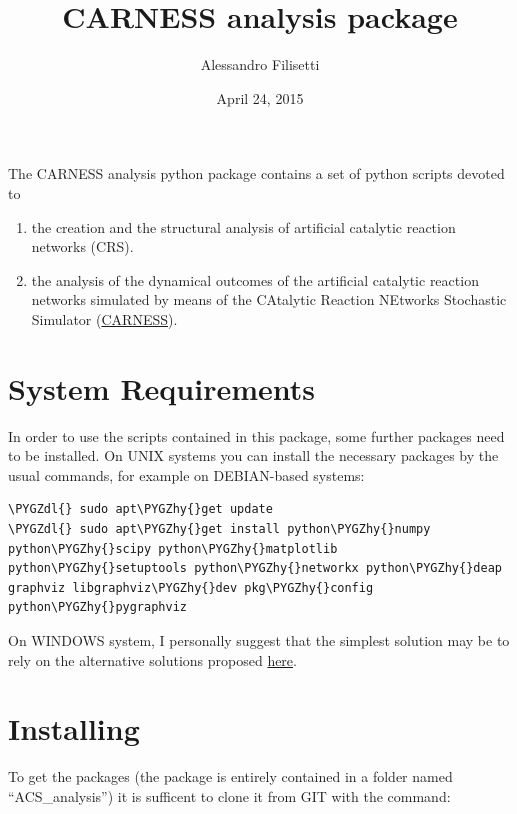\documentclass[letterpaper,10pt,english]{sphinxmanual}
\title{CARNESS analysis package}
\date{April 24, 2015}
\author{Alessandro Filisetti}
\def\PYGZdl{\char`\$}
\def\PYGZhy{\char`\-}
\begin{document}
\maketitle
\tableofcontents
{}\label{index::doc}


The CARNESS analysis python package contains a set of python scripts devoted to
\begin{enumerate}
\item {} 
the creation and the structural analysis of artificial catalytic reaction networks (CRS).

\item {} 
the analysis of the dynamical outcomes of the artificial catalytic reaction networks simulated by means of the CAtalytic Reaction NEtworks Stochastic Simulator (\href{https://github.com/paxelito/carness}{CARNESS}).

\end{enumerate}


\chapter{System Requirements}
\label{index:carness-analysis-python-package-documentation}\label{index:system-requirements}
In order to use the scripts contained in this package, some further packages need to be installed.
On UNIX systems you can install the necessary packages by the usual commands, for example on DEBIAN-based systems:

\begin{Verbatim}[commandchars=\\\{\}]
\PYGZdl{} sudo apt\PYGZhy{}get update
\PYGZdl{} sudo apt\PYGZhy{}get install python\PYGZhy{}numpy python\PYGZhy{}scipy python\PYGZhy{}matplotlib python\PYGZhy{}setuptools python\PYGZhy{}networkx python\PYGZhy{}deap graphviz libgraphviz\PYGZhy{}dev pkg\PYGZhy{}config python\PYGZhy{}pygraphviz
\end{Verbatim}

On WINDOWS system, I personally suggest that the simplest solution may be to rely on the alternative solutions proposed \href{https://www.python.org/download/alternatives/}{here}.


\chapter{Installing}
\label{index:installing}
To get the packages (the package is entirely contained in a folder named ``ACS\_analysis'') it is sufficent to clone it from GIT with the command:
\end{document}
